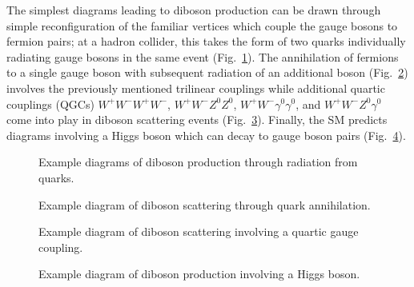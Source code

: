 The simplest diagrams leading to diboson production can be drawn through simple reconfiguration of the familiar vertices which couple the gauge bosons to fermion pairs; at a hadron collider, this takes the form of two quarks individually radiating gauge bosons in the same event (Fig.~\ref{fig:dibosons-radiation}).  
The annihilation of fermions to a single gauge boson with subsequent radiation of an additional boson (Fig.~\ref{fig:dibosons-annihilation}) involves the previously mentioned trilinear couplings while additional quartic couplings (QGCs) $W^+W^-W^+W^-$, $W^+W^-Z^0Z^0$, $W^+W^-\gamma^0\gamma^0$, and $W^+W^-Z^0\gamma^0$ come into play in diboson scattering events (Fig.~\ref{fig:dibosons-quartic}).  Finally, the SM predicts diagrams involving a Higgs boson which can decay to gauge boson pairs (Fig.~\ref{fig:dibosons-higgs}).

\begin{figure}
  \centering
  
  \hspace{1in}
  
  \caption{Example diagrams of diboson production through radiation from quarks.}
  \label{fig:dibosons-radiation}
\end{figure}

\begin{figure}
  \centering
  
  \caption{Example diagram of diboson scattering through quark annihilation.}
  \label{fig:dibosons-annihilation}
\end{figure}

\begin{figure}
  \centering
  
  \caption{Example diagram of diboson scattering involving a quartic gauge coupling.}
  \label{fig:dibosons-quartic}
\end{figure}

\begin{figure}
  \centering
  
  \caption{Example diagram of diboson production involving a Higgs boson.}
  \label{fig:dibosons-higgs}
\end{figure}

